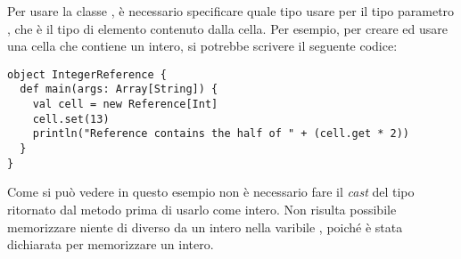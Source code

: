 Per usare la classe , \`e necessario specificare quale tipo usare per il tipo parametro , che \`e il tipo di elemento contenuto dalla cella. Per esempio, per creare ed usare una cella che contiene un intero, si potrebbe scrivere il seguente codice:
\begin{lstlisting}
object IntegerReference {
  def main(args: Array[String]) {
    val cell = new Reference[Int]
    cell.set(13)
    println("Reference contains the half of " + (cell.get * 2))
  }
}
\end{lstlisting}
Come si pu\`o vedere in questo esempio non \`e necessario fare il \emph{cast} del tipo ritornato dal metodo  prima di usarlo come intero. Non risulta possibile memorizzare niente di diverso da un intero nella varibile , poich\'e \`e stata dichiarata per memorizzare un intero.